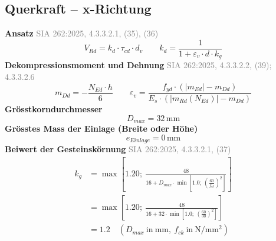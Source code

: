 \documentclass[11pt,a4paper]{article}
\newcommand{\normref}[1]{{\small\textcolor{gray}{#1}}}
\begin{document}
\subsection{Querkraft – x-Richtung}
\noindent\textbf{Ansatz} \hfill \normref{SIA 262:2025, 4.3.3.2.1, (35), (36)}
\begin{equation*}
V_{Rd} = k_d \cdot \tau_{cd} \cdot d_v \qquad k_d = \frac{1}{1 + \varepsilon_v \cdot d \cdot k_g}
\end{equation*}
\noindent\textbf{Dekompressionsmoment und Dehnung} \hfill \normref{SIA 262:2025, 4.3.3.2.2, (39); 4.3.3.2.6}
\begin{equation*}
m_{Dd} = -\frac{N_{Ed} \cdot h}{6} \qquad \varepsilon_v = \frac{f_{yd} \cdot \left(\left|m_{Ed}\right| - m_{Dd}\right)}{E_s \cdot \left(\left|m_{Rd}(N_{Ed})\right| - m_{Dd}\right)}
\end{equation*}
\noindent\textbf{Grösstkorndurchmesser}
\begin{equation*}
D_{max} = 32\,\mathrm{mm}
\end{equation*}
\noindent\textbf{Grösstes Mass der Einlage (Breite oder Höhe)}
\begin{equation*}
e_{Einlage} = 0\,\mathrm{mm}
\end{equation*}
\noindent\textbf{Beiwert der Gesteinskörnung} \hfill \normref{SIA 262:2025, 4.3.3.2.1, (37)}
\begin{equation*}
\begin{aligned}
  k_g &= \max\left[1.20;\ \frac{48}{16 + D_{max} \cdot \min\left[1.0;\ \left(\frac{60}{f_{ck}}\right)^{2}\right]}\right] \\
  &= \max\left[1.20;\ \frac{48}{16 + 32 \cdot \min\left[1.0;\ \left(\frac{60}{30}\right)^{2}\right]}\right] \\
  &= 1.2 \quad \left(D_{max}\ \text{in}\ \mathrm{mm},\ f_{ck}\ \text{in}\ \mathrm{N}/\mathrm{mm}^{2}\right)
\end{aligned}
\end{equation*}
\end{document}
